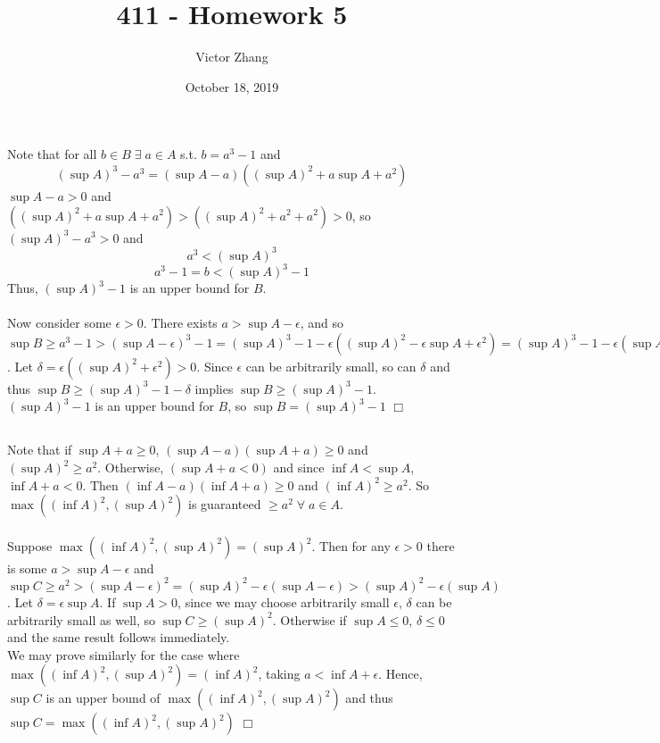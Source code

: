 \documentclass{article}
\title{411 - Homework 5}
\author{Victor Zhang }
\date{October 18, 2019}
\begin{document}
\maketitle

\section{}
\subsection{}
Note that for all $b\in B \; \exists \; a \in A$ s.t. $b = a^3 -1$ and
$$(\sup A)^3 - a^3 = \left(\sup A -a\right)\left((\sup A)^2 + a\sup A + a^2 \right)$$
$\sup A -a > 0$ and $\left((\sup A)^2 + a\sup A + a^2 \right) > \left((\sup A)^2 + a^2 + a^2 \right) > 0$, so $(\sup A)^3 - a^3 > 0$ and
$$a^3 < (\sup A)^3$$
$$a^3 -1 = b < (\sup A)^3 - 1$$
Thus, $(\sup A)^3 - 1$ is an upper bound for $B$.\\
\\
Now consider some $\epsilon > 0$. There exists $a > \sup A - \epsilon$, and so $\sup B \geq a^3 - 1 > (\sup A - \epsilon)^3 - 1 = (\sup A)^3 - 1 - \epsilon ((\sup A)^2 - \epsilon\sup A + \epsilon^2) = (\sup A)^3 - 1 - \epsilon(\sup A (\sup A - \epsilon)+\epsilon^2) > (\sup A)^3 - 1 - \epsilon(\sup A \sup A+\epsilon^2)$. Let $\delta = \epsilon((\sup A)^2+\epsilon^2) > 0$. Since $\epsilon$ can be arbitrarily small, so can $\delta$ and thus $\sup B \geq (\sup A)^3 -1 -\delta$ implies $\sup B \geq (\sup A)^3 - 1$. $(\sup A)^3 - 1$ is an upper bound for $B$, so $\sup B = (\sup A)^3 - 1$ $\Box$

\subsection{}
Note that if $\sup A + a \geq 0$, $(\sup A - a)(\sup A + a)\geq 0$ and $(\sup A)^2\geq a^2$. Otherwise, $(\sup A + a < 0)$ and since $\inf A < \sup A$, $\inf A + a < 0$. Then $(\inf A - a)(\inf A + a)\geq 0$ and $(\inf A)^2 \geq a^2$. So $\max ((\inf A)^2,(\sup A)^2)$ is guaranteed $\geq a^2 \; \forall \; a \in A$.\\
\\
Suppose $\max ((\inf A)^2,(\sup A)^2) = (\sup A)^2$. Then for any $\epsilon > 0$ there is some $a > \sup A - \epsilon$ and $\sup C \geq a^2 > (\sup A -\epsilon)^2 = (\sup A)^2 - \epsilon(\sup A - \epsilon) > (\sup A)^2 - \epsilon(\sup A)$. Let $\delta = \epsilon\sup A$. If $\sup A > 0$, since we may choose arbitrarily small $\epsilon$, $\delta$ can be arbitrarily small as well, so $\sup C \geq (\sup A)^2$. Otherwise if $\sup A \leq 0$, $\delta \leq 0$ and the same result follows immediately.\\
We may prove similarly for the case where $\max ((\inf A)^2,(\sup A)^2) = (\inf A)^2$, taking $a < \inf A + \epsilon$. Hence, $\sup C$ is an upper bound of $\max ((\inf A)^2,(\sup A)^2)$ and thus $\sup C = \max ((\inf A)^2,(\sup A)^2)$ $\Box$
\end{document}
